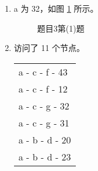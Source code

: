     \begin{solution}
        \begin{enumerate}
            \item a 为 32，如图 \ref{fig:p301} 所示。
            \begin{figure}[H]
                \centering
                
                \caption{题目3第(1)题}\label{fig:p301}
            \end{figure}
            \item 访问了 11 个节点。
            
            \begin{tabular}{l}
                \toprule
                a - c - f - 43 \\
                a - c - f - 12 \\
                a - c - g - 32 \\
                a - c - g - 31 \\
                a - b - d - 20 \\
                a - b - d - 23 \\
                \bottomrule
            \end{tabular}
        \end{enumerate}
    \end{solution}

